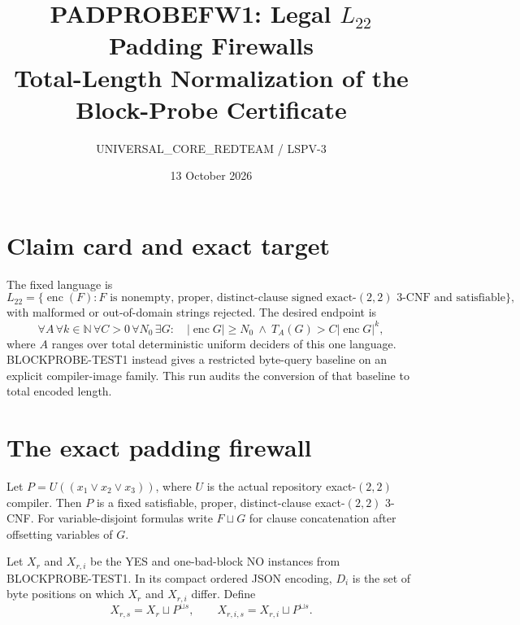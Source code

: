 \documentclass[11pt]{article}
\title{PADPROBEFW1: Legal \(L_{22}\) Padding Firewalls\\Total-Length Normalization of the Block-Probe Certificate}
\author{UNIVERSAL\_CORE\_REDTEAM / LSPV-3}
\date{13 October 2026}
\newcommand{\Ltwo}{L_{22}}
\begin{document}
\maketitle

\begin{center}
\end{center}

\section{Claim card and exact target}
The fixed language is
\[
 \Ltwo=\{\operatorname{enc}(F):F\text{ is nonempty, proper,
 distinct-clause signed exact-}(2,2)\text{ 3-CNF and satisfiable}\},
\]
with malformed or out-of-domain strings rejected.  The desired endpoint is
\[
 \forall A\,\forall k\in\mathbb N\,\forall C>0\,\forall N_0\,
 \exists G:\quad |\operatorname{enc}G|\ge N_0
 \ \land\ T_A(G)>C|\operatorname{enc}G|^k ,
\]
where $A$ ranges over total deterministic uniform deciders of this one
language.  BLOCKPROBE-TEST1 instead gives a restricted byte-query baseline on
an explicit compiler-image family.  This run audits the conversion of that
baseline to total encoded length.

\section{The exact padding firewall}
Let $P=U((x_1\vee x_2\vee x_3))$, where $U$ is the actual repository
exact-$(2,2)$ compiler.  Then $P$ is a fixed satisfiable, proper,
distinct-clause exact-$(2,2)$ 3-CNF.  For variable-disjoint formulas write
$F\sqcup G$ for clause concatenation after offsetting variables of $G$.

Let $X_r$ and $X_{r,i}$ be the YES and one-bad-block NO instances from
BLOCKPROBE-TEST1.  In its compact ordered JSON encoding, $D_i$ is the set of
byte positions on which $X_r$ and $X_{r,i}$ differ.  Define
\[
 X_{r,s}=X_r\sqcup P^{\sqcup s},\qquad
 X_{r,i,s}=X_{r,i}\sqcup P^{\sqcup s}.
\]
\end{document}
